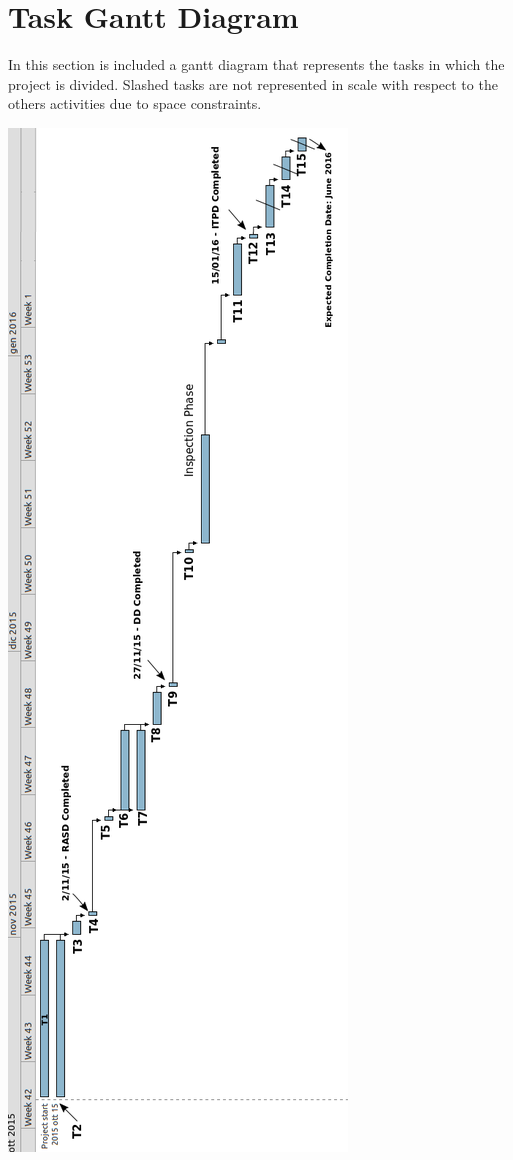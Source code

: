 \documentclass[11pt,titlepage]{article} %
\begin{document}
\section{Task Gantt Diagram}
 In this section is included a gantt diagram that represents the tasks in which the project is divided.\newline
 Slashed tasks are not represented in scale with respect to the others activities due to space constraints.\newline 
 \begin{center}
  \includegraphics[scale=0.35]{ganttnew.png}
 \end{center}
\newpage
\end{document}
